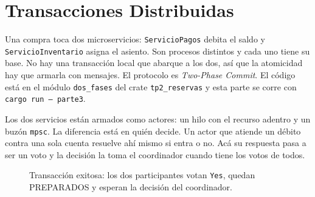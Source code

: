 \section{Transacciones Distribuidas}

Una compra toca dos microservicios: \texttt{ServicioPagos} debita el saldo y
\texttt{ServicioInventario} asigna el asiento. Son procesos distintos y cada
uno tiene su base. No hay una transacción local que abarque a los dos, así
que la atomicidad hay que armarla con mensajes. El protocolo es
\emph{Two-Phase Commit}. El código está en el módulo \texttt{dos\_fases} del
crate \texttt{tp2\_reservas} y esta parte se corre con
\texttt{cargo run -- parte3}.

Los dos servicios están armados como actores: un hilo con el recurso adentro
y un buzón \texttt{mpsc}. La diferencia está en quién decide. Un actor que
atiende un débito contra una sola cuenta resuelve ahí mismo si entra o no.
Acá su respuesta pasa a ser un voto y la decisión la toma el coordinador
cuando tiene los votos de todos.

\begin{figure}[H]
\centering
{}
\caption{Transacción exitosa: los dos participantes votan \texttt{Yes},
quedan PREPARADOS y esperan la decisión del coordinador.}
\label{fig:2pc-secuencia}
\end{figure}


